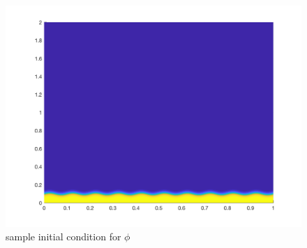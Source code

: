 \documentclass[a4paper,12pt]{article}
\begin{document}
\begin{figure}
\centering
\includegraphics[width=0.5\linewidth]{./figures/phi_initial.png}
\caption{sample initial condition for $\phi$}
\end{figure}








\end{document}
